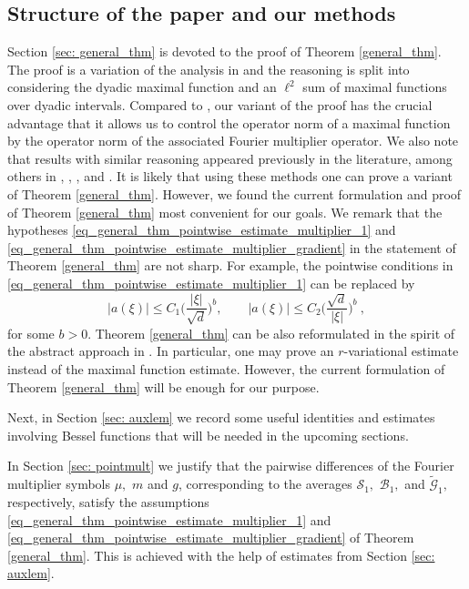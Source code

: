 \documentclass[a4paper, reqno]{amsart}
\theoremstyle{definition}
\newcommand{\tmG}{\tilde{\mathcal{G}}}
\newcommand{\mB}{\mathcal{B}}
\newcommand{\mS}{\mathcal{S}}
\begin{document}
\subsection{Structure of the paper and our methods}
Section \ref{sec: general_thm} is devoted to the proof of Theorem \ref{general_thm}. The proof is a variation of the analysis in \cite[Section~4]{BMSW21} and the reasoning is split into considering the dyadic maximal function and an $\ell^2$ sum of maximal functions over dyadic intervals. Compared to \cite{BMSW21}, our  variant of the proof has the crucial advantage that it allows us to control the operator norm of a maximal function by the operator norm of the associated Fourier multiplier operator. We also note that results with similar reasoning appeared previously in the literature, among others in \cite[Lemma~3]{B86}, \cite[Proposition i) p.\  271]{Car1}, \cite[Theorem A]{DRdF1}, and \cite[Section 3, Corollary]{RdF1}. It is likely that using these methods one can prove a variant of Theorem \ref{general_thm}. However, we found the current formulation and proof of Theorem \ref{general_thm} most convenient for our goals. We remark that the hypotheses \eqref{eq_general_thm_pointwise_estimate_multiplier_1} and \eqref{eq_general_thm_pointwise_estimate_multiplier_gradient} in the statement of Theorem \ref{general_thm} are not sharp. For example, the pointwise conditions in \eqref{eq_general_thm_pointwise_estimate_multiplier_1} can be replaced by
$$|a(\xi)|\leq C_1 \bigg(\frac{|\xi|}{\sqrt{d}}\bigg)^b,\qquad |a(\xi)|\le C_2\bigg( \frac{\sqrt{d}}{|\xi|}\bigg)^b~,$$
for some $b>0$. %
Theorem \ref{general_thm} can be %
  also reformulated in the spirit of the abstract approach in \cite{MSZK20}. In particular, one may prove an $r$-variational estimate instead of the maximal function estimate. However, the current formulation of Theorem \ref{general_thm}  will be enough for our purpose. 

Next, in Section \ref{sec: auxlem} we record some useful identities and estimates involving Bessel functions that will be needed in the upcoming sections.

In Section \ref{sec: pointmult} we justify that the pairwise differences of the Fourier multiplier symbols $\mu,$ $m$ and $g$, corresponding to the averages $\mS_1,$ $\mB_1,$ and $\tmG_1,$ respectively, 
satisfy the assumptions \eqref{eq_general_thm_pointwise_estimate_multiplier_1} and \eqref{eq_general_thm_pointwise_estimate_multiplier_gradient} of Theorem \ref{general_thm}. This is achieved with the help of estimates from Section \ref{sec: auxlem}.
\end{document}
